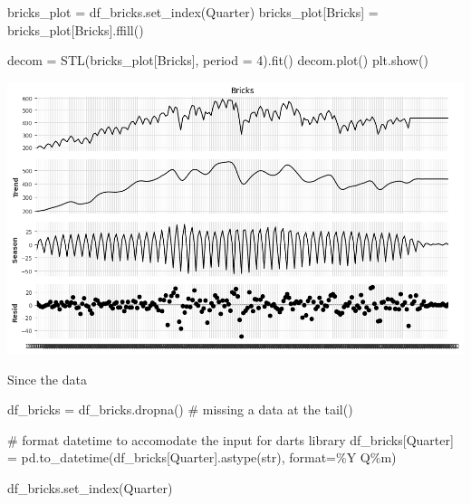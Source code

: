 \documentclass[
  11pt,
]{article}
\newenvironment{Shaded}{\begin{snugshade}}{\end{snugshade}}
\newcommand{\BuiltInTok}[1]{\textcolor[rgb]{0.00,0.23,0.31}{#1}}
\newcommand{\CommentTok}[1]{\textcolor[rgb]{0.37,0.37,0.37}{#1}}
\newcommand{\DecValTok}[1]{\textcolor[rgb]{0.68,0.00,0.00}{#1}}
\newcommand{\NormalTok}[1]{\textcolor[rgb]{0.00,0.23,0.31}{#1}}
\newcommand{\OperatorTok}[1]{\textcolor[rgb]{0.37,0.37,0.37}{#1}}
\newcommand{\StringTok}[1]{\textcolor[rgb]{0.13,0.47,0.30}{#1}}
\begin{document}
\begin{Shaded}
\begin{Highlighting}[]
\NormalTok{bricks\_plot }\OperatorTok{=}\NormalTok{ df\_bricks.set\_index(}\StringTok{\textquotesingle{}Quarter\textquotesingle{}}\NormalTok{)}
\NormalTok{bricks\_plot[}\StringTok{\textquotesingle{}Bricks\textquotesingle{}}\NormalTok{] }\OperatorTok{=}\NormalTok{ bricks\_plot[}\StringTok{\textquotesingle{}Bricks\textquotesingle{}}\NormalTok{].ffill()}

\NormalTok{decom }\OperatorTok{=}\NormalTok{ STL(bricks\_plot[}\StringTok{\textquotesingle{}Bricks\textquotesingle{}}\NormalTok{], period }\OperatorTok{=} \DecValTok{4}\NormalTok{).fit()}
\NormalTok{decom.plot()}
\NormalTok{plt.show()}
\end{Highlighting}
\end{Shaded}

\includegraphics{hw3_files/figure-pdf/cell-12-output-1.png}

Since the data

\begin{Shaded}
\begin{Highlighting}[]

\NormalTok{df\_bricks }\OperatorTok{=}\NormalTok{ df\_bricks.dropna() }\CommentTok{\# missing a data at the tail() }

\CommentTok{\# format datetime to accomodate the input for darts library}
\NormalTok{df\_bricks[}\StringTok{\textquotesingle{}Quarter\textquotesingle{}}\NormalTok{] }\OperatorTok{=}\NormalTok{ pd.to\_datetime(df\_bricks[}\StringTok{\textquotesingle{}Quarter\textquotesingle{}}\NormalTok{].astype(}\BuiltInTok{str}\NormalTok{), }\BuiltInTok{format}\OperatorTok{=}\StringTok{\textquotesingle{}\%Y Q\%m\textquotesingle{}}\NormalTok{)}

\NormalTok{df\_bricks.set\_index(}\StringTok{\textquotesingle{}Quarter\textquotesingle{}}\NormalTok{)}
\end{Highlighting}
\end{Shaded}
\end{document}

